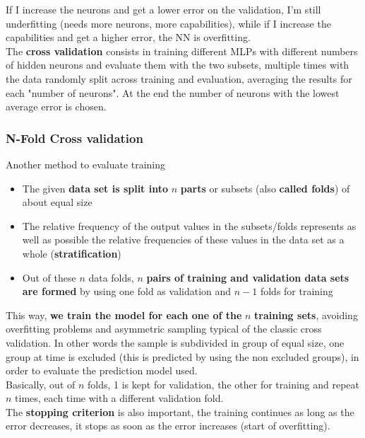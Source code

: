 If I increase the neurons and get a lower error on the validation, I'm still underfitting (needs more neurons, more capabilities), while if I increase the capabilities and get a higher error, the NN is overfitting.\\

The \textbf{cross validation} consists in training different MLPs with different numbers of hidden neurons and evaluate them with the two subsets, multiple times with the data randomly split across training and evaluation, averaging the results for each "number of neurons". At the end the number of neurons with the lowest average error is chosen.\\

\newpage

\subsubsection{N-Fold Cross validation} 

Another method to evaluate training
\begin{itemize}
	\item The given \textbf{data set is split into} $n$ \textbf{parts} or subsets (also \textbf{called folds}) of about equal size
	\item The relative frequency of the output values in the subsets/folds represents as well as possible the relative frequencies of these values in the data set as a whole (\textbf{stratification})
	\item Out of these $n$ data folds, $n$ \textbf{pairs of training and validation data sets are formed} by using one fold as validation and $n-1$ folds for training
\end{itemize}

This way, \textbf{we train the model for each one of the} $n$ \textbf{training sets}, avoiding overfitting problems and asymmetric sampling typical of the classic cross validation. In other words the sample is subdivided in group of equal size, one group at time is excluded (this is predicted by using the non excluded groups), in order to evaluate the prediction model used. \\

Basically, out of $n$ folds, 1 is kept for validation, the other for training and repeat $n$ times, each time with a different validation fold.\\

The \textbf{stopping criterion} is also important, the training continues as long as the error decreases, it stops as soon as the error increases (start of overfitting).\\

